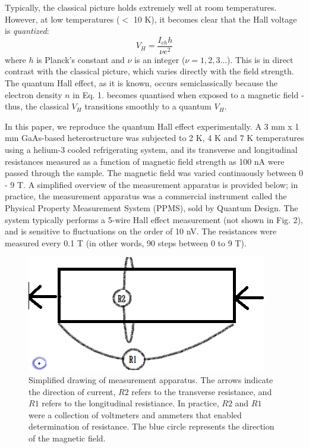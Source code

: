 \documentclass[aps,prl,nofootinbib,twocolumn,superscriptaddress,groupedaddress]{revtex4}  %
\begin{document}
Typically, the classical picture holds extremely well at room temperatures. However, at low temperatures ($<$ 10 K), it becomes clear that the Hall voltage  is \textit{quantized}\cite{lab}:
\begin{equation}
V_{H} = \frac{I_{ch}h}{\nu e^{2}}
\end{equation}
where $h$ is Planck's constant and $\nu$ is an integer ($\nu = 1, 2, 3 \ldots$). This is in direct contrast with the classical picture, which varies directly with the field strength. The quantum Hall effect, as it is known, occurs semiclassically because the electron density $n$ in Eq. 1. becomes quantised when exposed to a magnetic field \cite{lab} - thus, the classical $V_{H}$ transitions smoothly to a quantum $V_{H}$.

In this paper, we reproduce the quantum Hall effect experimentally. A 3 mm x 1 mm GaAs-based heterostructure was subjected to 2 K, 4 K and 7 K temperatures using a helium-3 cooled refrigerating system, and its transverse and longitudinal resistances measured as a function of magnetic field strength as 100 nA were passed through the sample. The magnetic field was varied continuously between 0 - 9 T. A simplified overview of the measurement apparatus is provided below; in practice, the measurement apparatus was a commercial instrument called the Physical Property Measurement System (PPMS), sold by Quantum Design\cite{qd}. The system typically performs a 5-wire Hall effect measurement (not shown in Fig. 2), and is sensitive to fluctuations on the order of 10 nV. The resistances were measured every 0.1 T (in other words, 90 steps between 0 to 9 T). 

\begin{figure}[b]
\centering
\includegraphics[scale=0.8]{InstrumentOverview.png} 
\caption{Simplified drawing of measurement apparatus. The arrows indicate the direction of current, $R2$ refers to the transverse resistance, and $R1$ refers to the longitudinal resistiance. In practice, $R2$ and $R1$ were a collection of voltmeters and ammeters that enabled determination of resistance. The blue circle represents the direction of the magnetic field.}
\end{figure}
\end{document}
